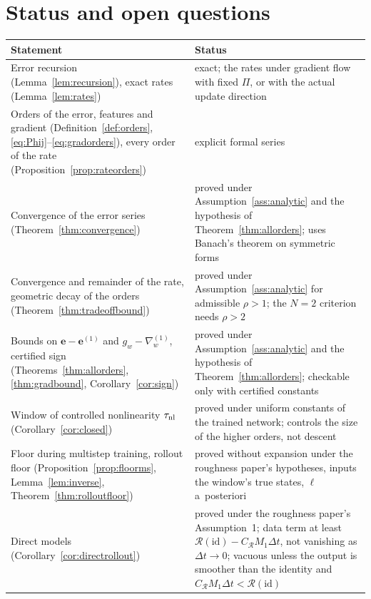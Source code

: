 \documentclass[11pt]{article}
\theoremstyle{definition}
\theoremstyle{remark}
\newcommand{\ee}{\mathbf{e}}
\newcommand{\Rgh}{\mathcal{R}}
\newcommand{\dt}{\Delta t}
\begin{document}
\section{Status and open questions}\label{sec:status}

\begin{center}
\small
\begin{tabular}{p{}p{}}
\toprule
Statement & Status \\
\midrule
Error recursion (Lemma~\ref{lem:recursion}), exact rates (Lemma~\ref{lem:rates}) & exact; the rates under gradient flow with fixed $\Pi$, or with the actual update direction \\
Orders of the error, features and gradient (Definition~\ref{def:orders}, \eqref{eq:Phij}--\eqref{eq:gradorders}), every order of the rate (Proposition~\ref{prop:rateorders}) & explicit formal series \\
Convergence of the error series (Theorem~\ref{thm:convergence}) & proved under Assumption~\ref{ass:analytic} and the hypothesis of Theorem~\ref{thm:allorders}; uses Banach's theorem on symmetric forms \\
Convergence and remainder of the rate, geometric decay of the orders (Theorem~\ref{thm:tradeoffbound}) & proved under Assumption~\ref{ass:analytic} for admissible $\rho>1$; the $N=2$ criterion needs $\rho>2$ \\
Bounds on $\ee-\ee^{(1)}$ and $g_w-\nabla^{(1)}_w$, certified sign (Theorems~\ref{thm:allorders}, \ref{thm:gradbound}, Corollary~\ref{cor:sign}) & proved under Assumption~\ref{ass:analytic} and the hypothesis of Theorem~\ref{thm:allorders}; checkable only with certified constants \\
Window of controlled nonlinearity $\tau_{\rm nl}$ (Corollary~\ref{cor:closed}) & proved under uniform constants of the trained network; controls the size of the higher orders, not descent \\
Floor during multistep training, rollout floor (Proposition~\ref{prop:floorms}, Lemma~\ref{lem:inverse}, Theorem~\ref{thm:rolloutfloor}) & proved without expansion under the roughness paper's hypotheses, inputs the window's true states, $\ell$ a~posteriori \\
Direct models (Corollary~\ref{cor:directrollout}) & proved under the roughness paper's Assumption~1; data term at least $\Rgh(\mathrm{id})-C_\Rgh M_1\dt$, not vanishing as $\dt\to0$; vacuous unless the output is smoother than the identity and $C_\Rgh M_1\dt<\Rgh(\mathrm{id})$ \\

\end{tabular}
\end{center}
\end{document}
